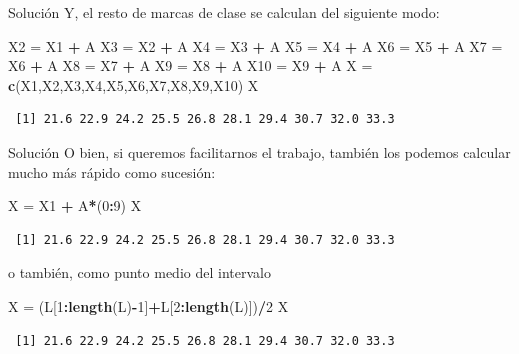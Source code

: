 \documentclass[
  ignorenonframetext,
]{beamer}
\newenvironment{Shaded}{\begin{snugshade}}{\end{snugshade}}
\newcommand{\DecValTok}[1]{\textcolor[rgb]{0.00,0.00,0.81}{#1}}
\newcommand{\FunctionTok}[1]{\textcolor[rgb]{0.13,0.29,0.53}{\textbf{#1}}}
\newcommand{\NormalTok}[1]{#1}
\newcommand{\OtherTok}[1]{\textcolor[rgb]{0.56,0.35,0.01}{#1}}
\newcommand{\SpecialCharTok}[1]{\textcolor[rgb]{0.81,0.36,0.00}{\textbf{#1}}}
\begin{document}
\begin{frame}[fragile]{Solución}
\label{soluciuxf3n-9}
Y, el resto de marcas de clase se calculan del siguiente modo:

\begin{Shaded}
\begin{Highlighting}[]
\NormalTok{X2 }\OtherTok{=}\NormalTok{ X1 }\SpecialCharTok{+}\NormalTok{ A}
\NormalTok{X3 }\OtherTok{=}\NormalTok{ X2 }\SpecialCharTok{+}\NormalTok{ A}
\NormalTok{X4 }\OtherTok{=}\NormalTok{ X3 }\SpecialCharTok{+}\NormalTok{ A}
\NormalTok{X5 }\OtherTok{=}\NormalTok{ X4 }\SpecialCharTok{+}\NormalTok{ A}
\NormalTok{X6 }\OtherTok{=}\NormalTok{ X5 }\SpecialCharTok{+}\NormalTok{ A}
\NormalTok{X7 }\OtherTok{=}\NormalTok{ X6 }\SpecialCharTok{+}\NormalTok{ A}
\NormalTok{X8 }\OtherTok{=}\NormalTok{ X7 }\SpecialCharTok{+}\NormalTok{ A}
\NormalTok{X9 }\OtherTok{=}\NormalTok{ X8 }\SpecialCharTok{+}\NormalTok{ A}
\NormalTok{X10 }\OtherTok{=}\NormalTok{ X9 }\SpecialCharTok{+}\NormalTok{ A}
\NormalTok{X }\OtherTok{=} \FunctionTok{c}\NormalTok{(X1,X2,X3,X4,X5,X6,X7,X8,X9,X10)}
\NormalTok{X}
\end{Highlighting}
\end{Shaded}

\begin{verbatim}
 [1] 21.6 22.9 24.2 25.5 26.8 28.1 29.4 30.7 32.0 33.3
\end{verbatim}
\end{frame}

\begin{frame}[fragile]{Solución}
\label{soluciuxf3n-10}
O bien, si queremos facilitarnos el trabajo, también los podemos
calcular mucho más rápido como sucesión:

\begin{Shaded}
\begin{Highlighting}[]
\NormalTok{X }\OtherTok{=}\NormalTok{ X1 }\SpecialCharTok{+}\NormalTok{ A}\SpecialCharTok{*}\NormalTok{(}\DecValTok{0}\SpecialCharTok{:}\DecValTok{9}\NormalTok{)}
\NormalTok{X}
\end{Highlighting}
\end{Shaded}

\begin{verbatim}
 [1] 21.6 22.9 24.2 25.5 26.8 28.1 29.4 30.7 32.0 33.3
\end{verbatim}

o también, como punto medio del intervalo

\begin{Shaded}
\begin{Highlighting}[]
\NormalTok{X }\OtherTok{=}\NormalTok{ (L[}\DecValTok{1}\SpecialCharTok{:}\FunctionTok{length}\NormalTok{(L)}\SpecialCharTok{{-}}\DecValTok{1}\NormalTok{]}\SpecialCharTok{+}\NormalTok{L[}\DecValTok{2}\SpecialCharTok{:}\FunctionTok{length}\NormalTok{(L)])}\SpecialCharTok{/}\DecValTok{2}
\NormalTok{X}
\end{Highlighting}
\end{Shaded}

\begin{verbatim}
 [1] 21.6 22.9 24.2 25.5 26.8 28.1 29.4 30.7 32.0 33.3
\end{verbatim}
\end{frame}
\end{document}
